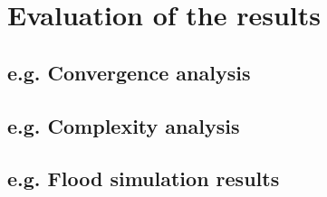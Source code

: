 
\chapter{Evaluation of the results} \label{chap:evaluation}

\bt

\section{e.g. Convergence analysis} \label{sec:convergence}

\bt

\section{e.g. Complexity analysis} \label{sec:complexity}

\bt

\section{e.g. Flood simulation results} \label{sec:flood-results}

\bt
